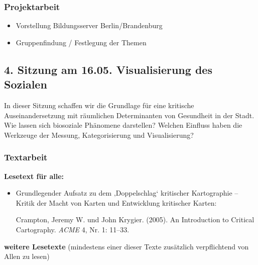 \documentclass[
  ngerman,
]{article}
\providecommand{\tightlist}{%
  \setlength{\itemsep}{0pt}\setlength{\parskip}{0pt}}
\begin{document}
\hypertarget{projektarbeit-1}{%
\subsubsection*{Projektarbeit}\label{projektarbeit-1}}

\begin{itemize}
\tightlist
\item
  Vorstellung Bildungsserver Berlin/Brandenburg
\item
  Gruppenfindung / Festlegung der Themen
\end{itemize}

\hypertarget{sitzung-am-16.05.-visualisierung-des-sozialen}{%
\subsection*{4. Sitzung am 16.05. \textbar{} Visualisierung des Sozialen}\label{sitzung-am-16.05.-visualisierung-des-sozialen}}

In dieser Sitzung schaffen wir die Grundlage für eine kritische Auseinandersetzung mit räumlichen Determinanten von Gesundheit in der Stadt. Wie lassen sich biosoziale Phänomene darstellen? Welchen Einfluss haben die Werkzeuge der Messung, Kategorisierung und Visualisierung?

\hypertarget{textarbeit-3}{%
\subsubsection*{Textarbeit}\label{textarbeit-3}}

\textbf{Lesetext für alle:}

\begin{itemize}
\item
  Grundlegender Aufsatz zu dem ‚Doppelschlag` kritischer Kartographie -- Kritik der Macht von Karten und Entwicklung kritischer Karten:

  Crampton, Jeremy W. und John Krygier. (2005). An Introduction to Critical Cartography. \emph{ACME} 4, Nr. 1: 11--33.
\end{itemize}

\textbf{weitere Lesetexte}
(mindestens einer dieser Texte zusätzlich verpflichtend von Allen zu lesen)
\end{document}
